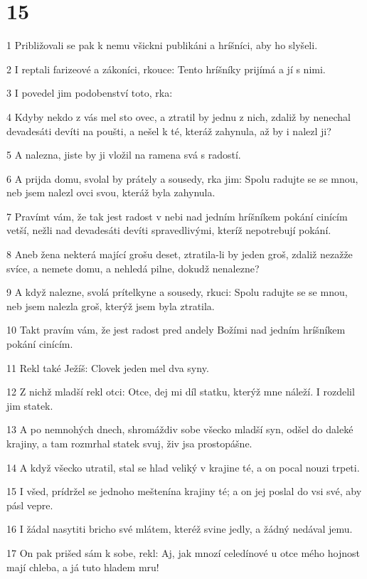 \chapter{15}

\par 1 Približovali se pak k nemu všickni publikáni a hríšníci, aby ho slyšeli.
\par 2 I reptali farizeové a zákoníci, rkouce: Tento hríšníky prijímá a jí s nimi.
\par 3 I povedel jim podobenství toto, rka:
\par 4 Kdyby nekdo z vás mel sto ovec, a ztratil by jednu z nich, zdaliž by nenechal devadesáti devíti na poušti, a nešel k té, kteráž zahynula, až by i nalezl ji?
\par 5 A nalezna, jiste by ji vložil na ramena svá s radostí.
\par 6 A prijda domu, svolal by prátely a sousedy, rka jim: Spolu radujte se se mnou, neb jsem nalezl ovci svou, kteráž byla zahynula.
\par 7 Pravímt vám, že tak jest radost v nebi nad jedním hríšníkem pokání cinícím vetší, nežli nad devadesáti devíti spravedlivými, kteríž nepotrebují pokání.
\par 8 Aneb žena nekterá mající grošu deset, ztratila-li by jeden groš, zdaliž nezažže svíce, a nemete domu, a nehledá pilne, dokudž nenalezne?
\par 9 A když nalezne, svolá prítelkyne a sousedy, rkuci: Spolu radujte se se mnou, neb jsem nalezla groš, kterýž jsem byla ztratila.
\par 10 Takt pravím vám, že jest radost pred andely Božími nad jedním hríšníkem pokání cinícím.
\par 11 Rekl také Ježíš: Clovek jeden mel dva syny.
\par 12 Z nichž mladší rekl otci: Otce, dej mi díl statku, kterýž mne náleží. I rozdelil jim statek.
\par 13 A po nemnohých dnech, shromáždiv sobe všecko mladší syn, odšel do daleké krajiny, a tam rozmrhal statek svuj, živ jsa prostopášne.
\par 14 A když všecko utratil, stal se hlad veliký v krajine té, a on pocal nouzi trpeti.
\par 15 I všed, prídržel se jednoho meštenína krajiny té; a on jej poslal do vsi své, aby pásl vepre.
\par 16 I žádal nasytiti bricho své mlátem, kteréž svine jedly, a žádný nedával jemu.
\par 17 On pak prišed sám k sobe, rekl: Aj, jak mnozí celedínové u otce mého hojnost mají chleba, a já tuto hladem mru!

